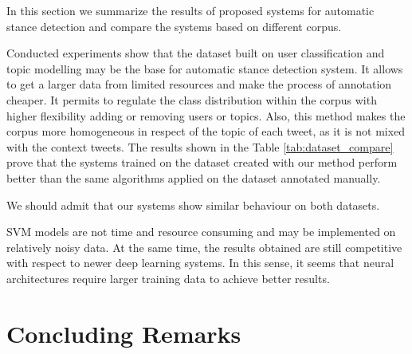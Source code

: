 \documentclass[10pt, a4paper]{article}
\begin{document}
In this section we summarize the results of proposed systems for automatic stance detection and compare the systems based on different corpus.

Conducted experiments show that the dataset built on user classification and topic modelling may be the base for automatic stance detection system. It allows to get a larger data from limited resources and make the process of annotation cheaper. It permits to regulate the class distribution within the corpus with higher flexibility adding or removing users or topics. Also, this method makes the corpus more homogeneous in respect of the topic of each tweet, as it is not mixed with the context tweets. The results shown in the Table \ref{tab:dataset_compare} prove that the systems trained on the dataset created with our method perform better than the same algorithms applied on the dataset annotated manually.

We should admit that our systems show similar behaviour on both datasets.

SVM models are not time and resource consuming and may be implemented on relatively noisy data. At the same time, the results obtained are still competitive with respect to newer deep learning systems. In this sense, it seems that neural architectures require larger training data to achieve better results.





\section{Concluding Remarks}
\end{document}
